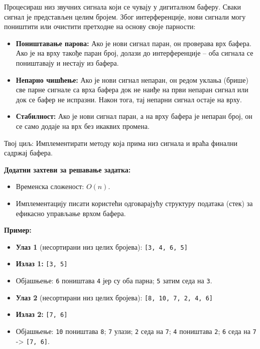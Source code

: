 Процесираш низ звучних сигнала који се чувају у дигиталном баферу. Сваки сигнал је представљен целим бројем. Због интерференције, нови сигнали могу поништити или очистити претходне на основу своје парности:

\begin{itemize}
	\item \textbf{Поништавање парова:} Ако је нови сигнал паран, он проверава врх бафера. Ако је на врху такође паран број, долази до интерференције -- оба сигнала се поништавају и нестају из бафера.
	\item \textbf{Непарно чишћење:} Ако је нови сигнал непаран, он редом уклања (брише) све парне сигнале са врха бафера док не наиђе на први непаран сигнал или док се бафер не испразни. Након тога, тај непарни сигнал остаје на врху.
	\item \textbf{Стабилност:} Ако је нови сигнал паран, а на врху бафера је непаран број, он се само додаје на врх без икаквих промена.
\end{itemize}

Твој циљ: Имплементирати методу која прима низ сигнала и враћа финални садржај бафера.

\textbf{Додатни захтеви за решавање задатка:}
\begin{itemize}
	\item Временска сложеност: $O(n)$.
	\item Имплементацију писати користећи одговарајућу структуру података (стек) за ефикасно управљање врхом бафера.
\end{itemize}

\textbf{Пример:}
\begin{itemize}
	\item \textbf{Улаз 1} (несортирани низ целих бројева): \texttt{[3, 4, 6, 5]}
	\item \textbf{Излаз 1:} \texttt{[3, 5]}
	\item Објашњење: \texttt{6} поништава \texttt{4} јер су оба парна; \texttt{5} затим седа на \texttt{3}.
	\item \textbf{Улаз 2} (несортирани низ целих бројева): \texttt{[8, 10, 7, 2, 4, 6]}
	\item \textbf{Излаз 2:} \texttt{[7, 6]}
	\item Објашњење: \texttt{10} поништава \texttt{8}; \texttt{7} улази; \texttt{2} седа на \texttt{7}; \texttt{4} поништава \texttt{2}; \texttt{6} седа на \texttt{7} -> \texttt{[7, 6]}.
\end{itemize}

